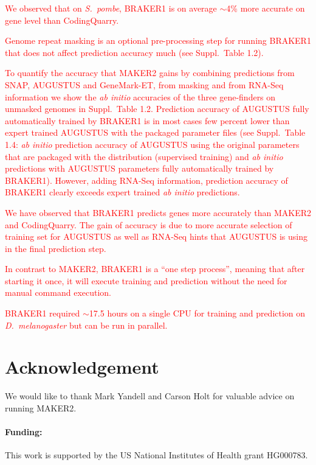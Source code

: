 \documentclass[a4paper,10pt]{article}
\begin{document}
\textcolor{red}{We observed that on \textit{S.~pombe}, BRAKER1 is on average $\sim$4\% more accurate on gene level than CodingQuarry.}

\textcolor{red}{Genome repeat masking is an optional pre-processing step for running BRAKER1 that does not affect prediction accuracy much (see Suppl.~Table 1.2).}

\textcolor{red}{To quantify the accuracy that MAKER2 gains by combining predictions from SNAP, AUGUSTUS and GeneMark-ET, from masking and from RNA-Seq information we show the \textit{ab initio} accuracies of the three gene-finders on unmasked genomes in Suppl.~Table 1.2.
Prediction accuracy of AUGUSTUS fully automatically trained by BRAKER1 is in most cases few percent lower than expert trained AUGUSTUS with the packaged parameter files (see Suppl.~Table 1.4: \textit{ab initio} prediction accuracy of AUGUSTUS using the original parameters that are packaged with the distribution (supervised training) and \textit{ab initio} predictions with AUGUSTUS parameters fully automatically trained by BRAKER1). However, adding RNA-Seq information, prediction accuracy of BRAKER1 clearly exceeds expert trained \textit{ab initio} predictions.}

\textcolor{red}{We have observed that BRAKER1 predicts genes more accurately than MAKER2 and CodingQuarry. The gain of accuracy is due to more accurate selection of training set for AUGUSTUS as well as RNA-Seq hints that AUGUSTUS is using in the final prediction step.}

\textcolor{red}{In contrast to MAKER2, BRAKER1 is a ``one step process'', meaning that after starting it once, it will execute training and prediction without the need for manual command execution.}

\textcolor{red}{BRAKER1 required $\sim$17.5 hours on a single CPU for training and prediction on \textit{D.~melanogaster} but can be run in parallel.}


\section*{Acknowledgement}

We would like to thank Mark Yandell and Carson Holt for valuable advice on running MAKER2.

\paragraph{Funding:} This work is supported by the US National Institutes of Health grant HG000783.
\end{document}
